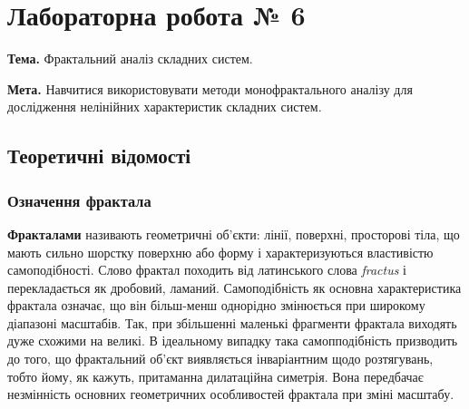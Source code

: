 \documentclass[
  letterpaper,
]{report}
\begin{document}

\hypertarget{ux43bux430ux431ux43eux440ux430ux442ux43eux440ux43dux430-ux440ux43eux431ux43eux442ux430-6}{%
\chapter{Лабораторна робота №
6}\label{ux43bux430ux431ux43eux440ux430ux442ux43eux440ux43dux430-ux440ux43eux431ux43eux442ux430-6}}

\textbf{Тема.} Фрактальний аналіз складних систем.

\textbf{Мета.} Навчитися використовувати методи монофрактального аналізу
для дослідження нелінійних характеристик складних систем.

\hypertarget{ux442ux435ux43eux440ux435ux442ux438ux447ux43dux456-ux432ux456ux434ux43eux43cux43eux441ux442ux456-5}{%
\section{Теоретичні
відомості}\label{ux442ux435ux43eux440ux435ux442ux438ux447ux43dux456-ux432ux456ux434ux43eux43cux43eux441ux442ux456-5}}

\hypertarget{ux43eux437ux43dux430ux447ux435ux43dux43dux44f-ux444ux440ux430ux43aux442ux430ux43bux430}{%
\subsection{Означення
фрактала}\label{ux43eux437ux43dux430ux447ux435ux43dux43dux44f-ux444ux440ux430ux43aux442ux430ux43bux430}}

\textbf{Фракталами} називають геометричні об'єкти: лінії, поверхні,
просторові тіла, що мають сильно шорстку поверхню або форму і
характеризуються властивістю самоподібності. Слово фрактал походить від
латинського слова \emph{fractus} і перекладається як дробовий, ламаний.
Самоподібність як основна характеристика фрактала означає, що він
більш-менш однорідно змінюється при широкому діапазоні масштабів. Так,
при збільшенні маленькі фрагменти фрактала виходять дуже схожими на
великі. В ідеальному випадку така самопподібність призводить до того, що
фрактальний об'єкт виявляється інваріантним щодо розтягувань, тобто
йому, як кажуть, притаманна дилатаційна симетрія. Вона передбачає
незмінність основних геометричних особливостей фрактала при зміні
масштабу.
\end{document}
